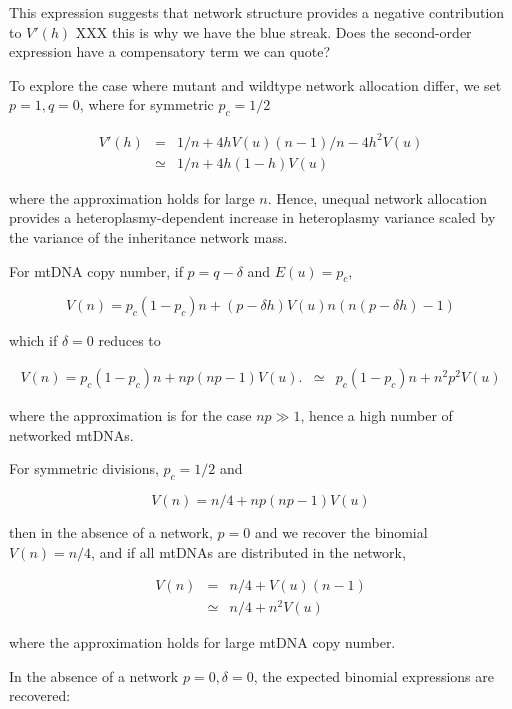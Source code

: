 \documentclass{article}
\begin{document}
This expression suggests that network structure provides a negative contribution to $V'(h)$  XXX this is why we have the blue streak. Does the second-order expression have a compensatory term we can quote?

To explore the case where mutant and wildtype network allocation differ, we set $p = 1, q = 0$, where for symmetric $p_c = 1/2$

\begin{eqnarray}
  V'(h) & = & 1/n + 4h V(u) (n-1)/n - 4h^2 V(u) \\
  & \simeq & 1/n + 4 h(1-h) V(u)
\end{eqnarray}

where the approximation holds for large $n$. Hence, unequal network allocation provides a heteroplasmy-dependent increase in heteroplasmy variance scaled by the variance of the inheritance network mass.

For mtDNA copy number, if $p = q - \delta$ and $E(u) = p_c$, 

\begin{equation}
  V(n) = p_c(1-p_c) n + (p - \delta h) V(u) n (n(p - \delta h) - 1)
\end{equation}

which if $\delta = 0$ reduces to

\begin{eqnarray}
  V(n) = p_c(1-p_c) n + n p (n p -1) V(u).
  & \simeq & p_c(1-p_c) n + n^2 p^2 V(u)
\end{eqnarray}

where the approximation is for the case $np \gg 1$, hence a high number of networked mtDNAs.

For symmetric divisions, $p_c = 1/2$ and

\begin{equation}
  V(n) = n/4 + n p (n p -1) V(u)
\end{equation}

then in the absence of a network, $p = 0$ and we recover the binomial $V(n) = n/4$, and if all mtDNAs are distributed in the network,

\begin{eqnarray}
  V(n) &=  &n/4 + V(u) (n-1) \\
  & \simeq& n/4 + n^2 V(u)
\end{eqnarray}

where the approximation holds for large mtDNA copy number.

In the absence of a network $p = 0, \delta = 0$, the expected binomial expressions are recovered:
\end{document}
